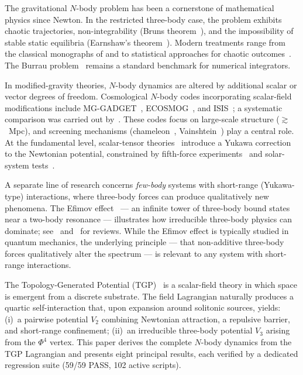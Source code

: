 \documentclass[11pt,a4paper]{article}
\begin{document}
The gravitational $N$-body problem has been a cornerstone of
mathematical physics since Newton.  In the restricted three-body case,
the problem exhibits chaotic trajectories, non-integrability (Bruns
theorem~\citep{Bruns1887}), and the impossibility of stable static
equilibria (Earnshaw's theorem~\citep{Earnshaw1842}).  Modern
treatments range from the classical monographs of
\citet{Valtonen2006} and \citet{Heggie2003} to statistical approaches
for chaotic outcomes~\citep{StoneLeigh2019,Manwadkar2021}.  The Burrau
problem~\citep{Burrau1913,Szebehely1967} remains a standard benchmark
for numerical integrators.

In modified-gravity theories, $N$-body dynamics are altered by
additional scalar or vector degrees of freedom.  Cosmological $N$-body
codes incorporating scalar-field modifications include
MG-GADGET~\citep{Puchwein2013}, ECOSMOG~\citep{Li2012}, and
ISIS~\citep{Llinares2014}; a systematic comparison was carried out
by~\citet{Winther2015}.  These codes focus on large-scale structure
($\gtrsim$~Mpc), and screening mechanisms
(chameleon~\citep{Khoury2004}, Vainshtein~\citep{Vainshtein1972})
play a central role.  At the fundamental level, scalar-tensor
theories~\citep{Damour1992} introduce a Yukawa correction to the
Newtonian potential, constrained by fifth-force
experiments~\citep{Adelberger2003,Murata2015} and solar-system
tests~\citep{Will2014,Bertotti2003}.

A separate line of research concerns \emph{few-body} systems with
short-range (Yukawa-type) interactions, where three-body forces can
produce qualitatively new phenomena.  The Efimov
effect~\citep{Efimov1970} --- an infinite tower of three-body bound
states near a two-body resonance --- illustrates how irreducible
three-body physics can dominate; see~\citet{Braaten2006}
and~\citet{Naidon2017} for reviews.  While the Efimov effect is
typically studied in quantum mechanics, the underlying principle ---
that non-additive three-body forces qualitatively alter the spectrum
--- is relevant to any system with short-range interactions.

The Topology-Generated Potential (TGP)~\citep{Serafin2026} is a
scalar-field theory in which space is emergent from a discrete
substrate.  The field Lagrangian naturally produces a quartic
self-interaction that, upon expansion around solitonic sources, yields:
(i)~a pairwise potential $V_2$ combining Newtonian attraction, a
repulsive barrier, and short-range confinement;  (ii)~an irreducible
three-body potential $V_3$ arising from the $\Phi^4$ vertex.  This
paper derives the complete $N$-body dynamics from the TGP Lagrangian
and presents eight principal results, each verified by a dedicated
regression suite (59/59 PASS, 102 active scripts).
\end{document}
